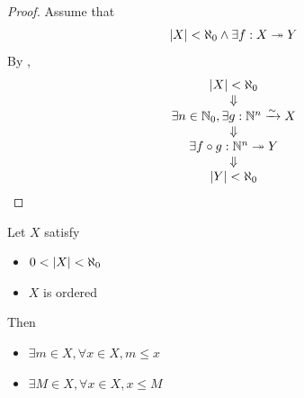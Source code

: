 \begin{proof}
    Assume that
    \[
    \abs*{X} < \aleph_{0} \land \exists f: X \twoheadrightarrow Y
    \]
    By
    ,
    \[
    \begin{array}{c}
        \abs*{X} < \aleph_{0} \\
        \Downarrow \\
        \exists n \in \N_{0}, \exists g: \N^{n} \xrightarrow{\sim} X \\
        \Downarrow \\
        \exists f \circ g: \N^{n} \twoheadrightarrow Y \\
        \Downarrow \\
        \abs*{Y} < \aleph_{0}
    \end{array}
    \]
\end{proof}

\bigskip

\begin{theorem} \label{an:thm:finite-ordered-set-has-extremum}
    Let $X$ satisfy
    \begin{itemize}
        \item $0 < \abs*{X} < \aleph_{0}$
        \item $X$ is ordered
    \end{itemize}
    Then
    \begin{itemize}
        \item $\exists m \in X, \forall x \in X, m \leq x$
        \item $\exists M \in X, \forall x \in X, x \leq M$
    \end{itemize}
\end{theorem}

